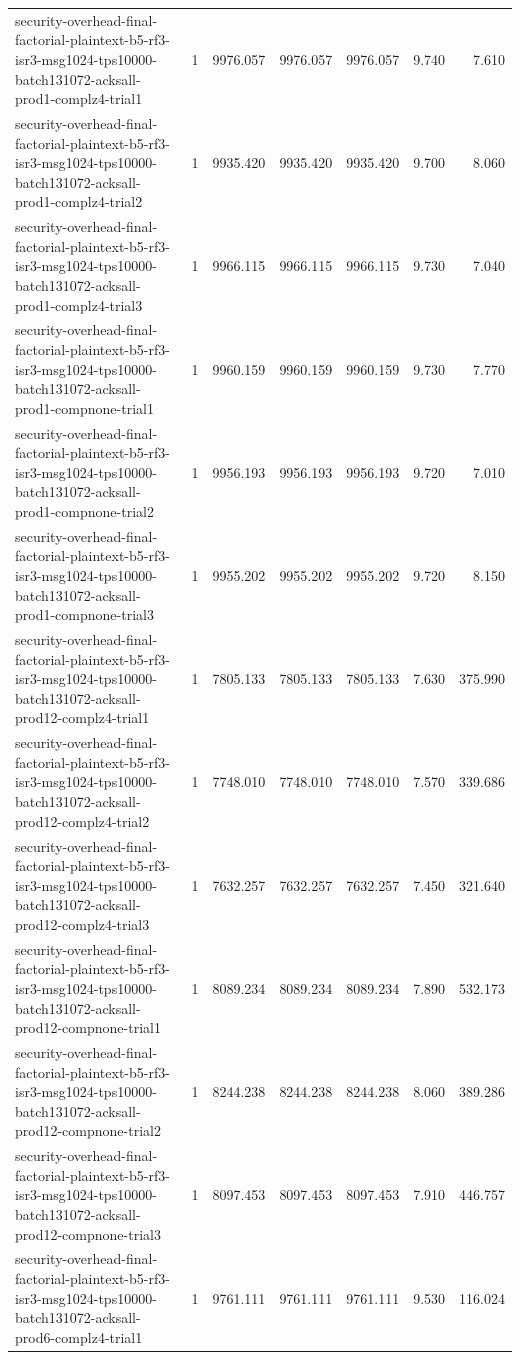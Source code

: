 \begin{tabular}{lrrrrrr}
security-overhead-final-factorial-plaintext-b5-rf3-isr3-msg1024-tps10000-batch131072-acksall-prod1-complz4-trial1 & 1 & 9976.057 & 9976.057 & 9976.057 & 9.740 & 7.610 \\
security-overhead-final-factorial-plaintext-b5-rf3-isr3-msg1024-tps10000-batch131072-acksall-prod1-complz4-trial2 & 1 & 9935.420 & 9935.420 & 9935.420 & 9.700 & 8.060 \\
security-overhead-final-factorial-plaintext-b5-rf3-isr3-msg1024-tps10000-batch131072-acksall-prod1-complz4-trial3 & 1 & 9966.115 & 9966.115 & 9966.115 & 9.730 & 7.040 \\
security-overhead-final-factorial-plaintext-b5-rf3-isr3-msg1024-tps10000-batch131072-acksall-prod1-compnone-trial1 & 1 & 9960.159 & 9960.159 & 9960.159 & 9.730 & 7.770 \\
security-overhead-final-factorial-plaintext-b5-rf3-isr3-msg1024-tps10000-batch131072-acksall-prod1-compnone-trial2 & 1 & 9956.193 & 9956.193 & 9956.193 & 9.720 & 7.010 \\
security-overhead-final-factorial-plaintext-b5-rf3-isr3-msg1024-tps10000-batch131072-acksall-prod1-compnone-trial3 & 1 & 9955.202 & 9955.202 & 9955.202 & 9.720 & 8.150 \\
security-overhead-final-factorial-plaintext-b5-rf3-isr3-msg1024-tps10000-batch131072-acksall-prod12-complz4-trial1 & 1 & 7805.133 & 7805.133 & 7805.133 & 7.630 & 375.990 \\
security-overhead-final-factorial-plaintext-b5-rf3-isr3-msg1024-tps10000-batch131072-acksall-prod12-complz4-trial2 & 1 & 7748.010 & 7748.010 & 7748.010 & 7.570 & 339.686 \\
security-overhead-final-factorial-plaintext-b5-rf3-isr3-msg1024-tps10000-batch131072-acksall-prod12-complz4-trial3 & 1 & 7632.257 & 7632.257 & 7632.257 & 7.450 & 321.640 \\
security-overhead-final-factorial-plaintext-b5-rf3-isr3-msg1024-tps10000-batch131072-acksall-prod12-compnone-trial1 & 1 & 8089.234 & 8089.234 & 8089.234 & 7.890 & 532.173 \\
security-overhead-final-factorial-plaintext-b5-rf3-isr3-msg1024-tps10000-batch131072-acksall-prod12-compnone-trial2 & 1 & 8244.238 & 8244.238 & 8244.238 & 8.060 & 389.286 \\
security-overhead-final-factorial-plaintext-b5-rf3-isr3-msg1024-tps10000-batch131072-acksall-prod12-compnone-trial3 & 1 & 8097.453 & 8097.453 & 8097.453 & 7.910 & 446.757 \\
security-overhead-final-factorial-plaintext-b5-rf3-isr3-msg1024-tps10000-batch131072-acksall-prod6-complz4-trial1 & 1 & 9761.111 & 9761.111 & 9761.111 & 9.530 & 116.024 \\

\end{tabular}
